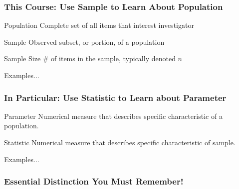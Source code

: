\begin{frame}
\frametitle{This Course: Use Sample to Learn About Population}


\begin{block}{Population}
Complete set of all items that interest investigator
\end{block}


\begin{block}{Sample}
Observed subset, or portion, of a population
\end{block}

\begin{block}{Sample Size}
\# of items in the sample, typically denoted $n$
\end{block}


\begin{block}{\hfill Examples...}\end{block}

\end{frame}



\begin{frame}

\frametitle{In Particular: Use Statistic to Learn about Parameter}

\begin{block}{Parameter}
Numerical measure that describes specific characteristic of a population.
\end{block}

\begin{block}{Statistic}
Numerical measure that describes specific characteristic of sample.
\end{block}

\begin{block}{\hfill Examples...}\end{block}

\end{frame}


\begin{frame}
\frametitle{Essential Distinction You Must Remember!}
\begin{figure}
\centering
{}
\end{figure}
\end{frame}

